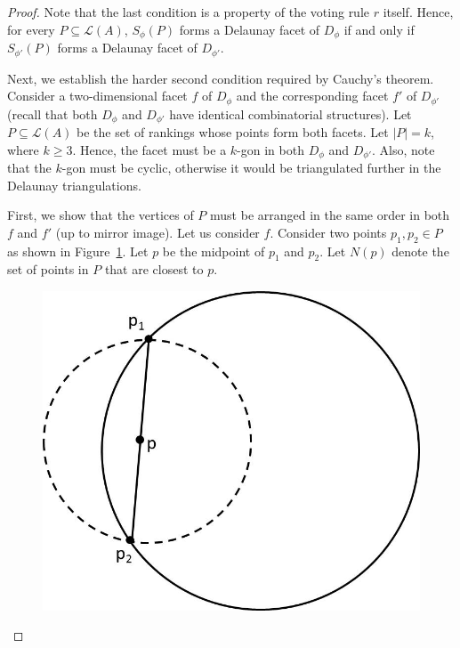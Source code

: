 \documentclass[10pt,letterpaper]{article}
\newcommand{\calL}{{\mathcal{L}}}
\newcommand{\rank}{{\calL(A)}}
\begin{document}
\begin{proof}
Note that the last condition is a property of the voting rule $r$ itself. Hence, for every $P \subseteq \rank$, $S_{\phi}(P)$ forms a Delaunay facet of $D_{\phi}$ if and only if $S_{\phi'}(P)$ forms a Delaunay facet of $D_{\phi'}$.

Next, we establish the harder second condition required by Cauchy's theorem. Consider a two-dimensional facet $f$ of $D_{\phi}$ and the corresponding facet $f'$ of $D_{\phi'}$ (recall that both $D_{\phi}$ and $D_{\phi'}$ have identical combinatorial structures). Let $P \subseteq \rank$ be the set of rankings whose points form both facets. Let $|P| = k$, where $k \ge 3$. Hence, the facet must be a $k$-gon in both $D_{\phi}$ and $D_{\phi'}$. Also, note that the $k$-gon must be cyclic, otherwise it would be triangulated further in the Delaunay triangulations. 

First, we show that the vertices of $P$ must be arranged in the same order in both $f$ and $f'$ (up to mirror image). Let us consider $f$. Consider two points $p_1, p_2 \in P$ as shown in Figure~\ref{fig:cyclic-polygon}. Let $p$ be the midpoint of $p_1$ and $p_2$. Let $N(p)$ denote the set of points in $P$ that are closest to $p$. 

\begin{figure}[ht]
\centering
\includegraphics[scale=0.5]{images/cyclic-polygon.jpg}
\label{fig:cyclic-polygon}
\end{figure}


\end{proof}
\end{document}
